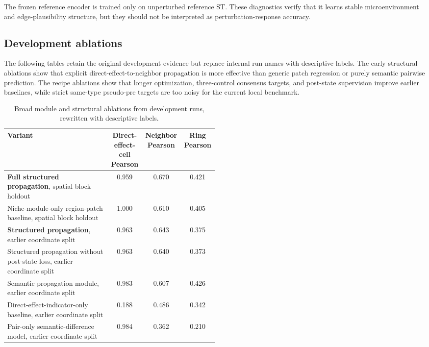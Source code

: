 \documentclass[sigconf,anonymous,review]{acmart}
\begin{document}
The frozen reference encoder is trained only on unperturbed reference ST. These diagnostics verify that it learns stable microenvironment and edge-plausibility structure, but they should not be interpreted as perturbation-response accuracy.

\subsection{Development ablations}
\label{app:development_ablations}

The following tables retain the original development evidence but replace internal run names with descriptive labels. The early structural ablations show that explicit direct-effect-to-neighbor propagation is more effective than generic patch regression or purely semantic pairwise prediction. The recipe ablations show that longer optimization, three-control consensus targets, and post-state supervision improve earlier baselines, while strict same-type pseudo-pre targets are too noisy for the current local benchmark.

\begin{table}[t]
\centering
\caption{Broad module and structural ablations from development runs, rewritten with descriptive labels.}
\label{tab:app_ablation_modules}
\small
\setlength{\tabcolsep}{8pt}
\renewcommand{\arraystretch}{1.14}
\begin{tabular}{@{}p{0.50\linewidth}ccc@{}}
\toprule
Variant & \makecell[c]{Direct-effect-cell\\Pearson} & \makecell[c]{Neighbor\\Pearson} & \makecell[c]{Ring\\Pearson} \\
\midrule
\textbf{Full structured propagation}, spatial block holdout & 0.959 & 0.670 & 0.421 \\
Niche-module-only region-patch baseline, spatial block holdout & 1.000 & 0.610 & 0.405 \\
\textbf{Structured propagation}, earlier coordinate split & 0.963 & 0.643 & 0.375 \\
Structured propagation without post-state loss, earlier coordinate split & 0.963 & 0.640 & 0.373 \\
Semantic propagation module, earlier coordinate split & 0.983 & 0.607 & 0.426 \\
Direct-effect-indicator-only baseline, earlier coordinate split & 0.188 & 0.486 & 0.342 \\
Pair-only semantic-difference model, earlier coordinate split & 0.984 & 0.362 & 0.210 \\
\bottomrule
\end{tabular}
\end{table}
\end{document}
